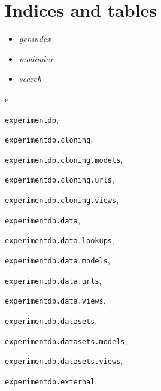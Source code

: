 \documentclass[letterpaper,10pt,english]{sphinxmanual}
\begin{document}
\chapter{Indices and tables}
\label{index:indices-and-tables}\begin{itemize}
\item {} 
\emph{genindex}

\item {} 
\emph{modindex}

\item {} 
\emph{search}

\end{itemize}


\renewcommand{\indexname}{Python Module Index}
\begin{theindex}
\def\bigletter#1{{\Large\sffamily#1}\nopagebreak\vspace{1mm}}
\bigletter{e}
\item {\texttt{experimentdb}}, \pageref{api:module-experimentdb}
\item {\texttt{experimentdb.cloning}}, \pageref{api:module-experimentdb.cloning}
\item {\texttt{experimentdb.cloning.models}}, \pageref{api:module-experimentdb.cloning.models}
\item {\texttt{experimentdb.cloning.urls}}, \pageref{api:module-experimentdb.cloning.urls}
\item {\texttt{experimentdb.cloning.views}}, \pageref{api:module-experimentdb.cloning.views}
\item {\texttt{experimentdb.data}}, \pageref{api:module-experimentdb.data}
\item {\texttt{experimentdb.data.lookups}}, \pageref{api:module-experimentdb.data.lookups}
\item {\texttt{experimentdb.data.models}}, \pageref{api:module-experimentdb.data.models}
\item {\texttt{experimentdb.data.urls}}, \pageref{api:module-experimentdb.data.urls}
\item {\texttt{experimentdb.data.views}}, \pageref{api:module-experimentdb.data.views}
\item {\texttt{experimentdb.datasets}}, \pageref{api:module-experimentdb.datasets}
\item {\texttt{experimentdb.datasets.models}}, \pageref{api:module-experimentdb.datasets.models}
\item {\texttt{experimentdb.datasets.views}}, \pageref{api:module-experimentdb.datasets.views}
\item {\texttt{experimentdb.external}}, \pageref{api:module-experimentdb.external}

\end{theindex}
\end{document}
